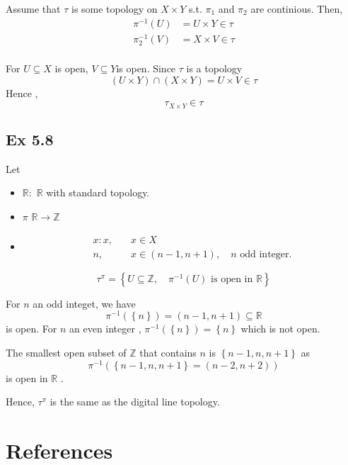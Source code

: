 \documentclass{article}
\theoremstyle{remark}
\newcommand{\newpara}
    {
    \vskip 0.4cm
    }
\begin{document}
\newpara

Assume that $\tau $  is some topology on $X \times  Y$ s.t. $\pi _{1}$  and $\pi _{2}$ are continious. Then, \[
\begin{split}
    \pi ^{-1}\left( U \right) &=  U \times Y \in \tau  \\
    \pi _{2}^{-1} \left( V \right) &=  X \times  V \in  \tau \\
\end{split}
\]

For $U \subseteq X$ is open, $V \subseteq Y$is open. Since $\tau $ is a topology \[
    \left( U \times Y \right) \cap \left( X \times Y \right) = U \times V \in  \tau
\]
Hence ,
\[
\tau _{X \times Y} \in \tau
\]

\subsection*{Ex 5.8}%
\label{sub:ex_5_8}

Let
\begin{itemize}
    \item $\mathbb{R} :$   $\mathbb{R} $   with standard topology.
    \item $\pi $   $\mathbb{R} \to \mathbb{Z} $
    \item \begin{align*}
        x: x, \quad  & x \in X  \\
          n , \quad&   x \in \left( n-1, n+1 \right) , \quad  n \text{ odd integer}
    .\end{align*}
\end{itemize}


\[
\tau ^{\pi } = \left\{ U \subseteq \mathbb{Z} , \quad \pi ^{-1} \left( U \right) \text{ is open in }\mathbb{R}  \right\}
\]

For $n$  an odd integet, we have \[
    \pi ^{-1}\left( \left\{ n \right\} \right) = \left( n-1, n+1 \right) \subseteq \mathbb{R}
\]
is open. For $n$  an even integer , $\pi ^{-1} \left( \left\{ n \right\} \right) = \left\{ n \right\}$ which is not
open.
\newpara

The smallest open subset of $\mathbb{Z} $ that contains $n$  is $\left\{ n-1, n, n+1 \right\}$ as \[
\pi ^{-1} \left( \left\{ n-1, n, n+1 \right\} = \left( n-2, n+2 \right) \right)
\]
is open in $\mathbb{R} $ .

Hence, $\tau ^{\pi }$  is the same as the digital line topology.





\newpage

\section{References}%
\label{sec:references}



\end{document}

